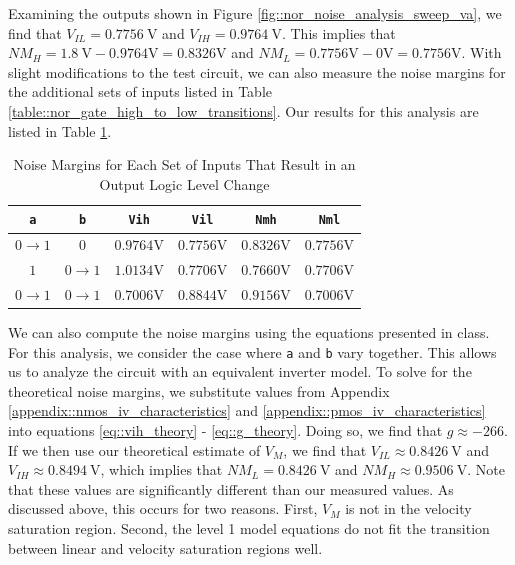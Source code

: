 \documentclass[fleqn]{article}
\begin{document}
	Examining the outputs shown in Figure \ref{fig::nor_noise_analysis_sweep_va}, we find that $V_{IL} = 0.7756\ \text{V}$ and $V_{IH} = 0.9764\ \text{V}$. This implies that $NM_{H} = 1.8\ \text{V} - 0.9764 \text{V} = 0.8326 \text{V}$ and $NM_{L} = 0.7756 \text{V} - 0 \text{V} = 0.7756 \text{V}$. With slight modifications to the test circuit, we can also measure the noise margins for the additional sets of inputs listed in Table \ref{table::nor_gate_high_to_low_transitions}. Our results for this analysis are listed in Table \ref{table::nor_gate_noise_analysis}.
	
	\begin{table}[H]
	\begin{center}
	\caption{Noise Margins for Each Set of Inputs That Result in an Output Logic Level Change}
	\label{table::nor_gate_noise_analysis}
	\begin{tabular}{| c | c | c | c | c | c |}
		\hline
		\texttt{a} & \texttt{b} & \texttt{Vih} & \texttt{Vil} & \texttt{Nmh} & \texttt{Nml} \\
		\hline	
		$0 \rightarrow 1$ & $0$ & $0.9764 \text{V}$ & $0.7756 \text{V}$ & $0.8326 \text{V}$ & $0.7756 \text{V}$\\
		\hline	
		$1$ & $0 \rightarrow 1$ & $1.0134 \text{V}$ & $0.7706 \text{V}$ & $0.7660 \text{V}$ & $0.7706 \text{V}$\\
		\hline	
		$0 \rightarrow 1$ & $0 \rightarrow 1$ & $0.7006 \text{V}$ & $0.8844 \text{V}$ & $0.9156 \text{V}$ & $0.7006 \text{V}$\\
		\hline
	\end{tabular}
	\end{center}
	\end{table}
	
	We can also compute the noise margins using the equations presented in class. For this analysis, we consider the case where \texttt{a} and \texttt{b} vary together. This allows us to analyze the circuit with an equivalent inverter model. To solve for the theoretical noise margins, we substitute values from Appendix \ref{appendix::nmos_iv_characteristics} and \ref{appendix::pmos_iv_characteristics} into equations \ref{eq::vih_theory} - \ref{eq::g_theory}. Doing so, we find that $g \approx -266$. If we then use our theoretical estimate of $V_{M}$, we find that $V_{IL} \approx 0.8426\ \text{V}$ and $V_{IH} \approx 0.8494\ \text{V}$, which implies that $NM_L = 0.8426\ \text{V}$ and $NM_H \approx 0.9506\ \text{V}$. Note that these values are significantly different than our measured values. As discussed above, this occurs for two reasons. First, $V_M$ is not in the velocity saturation region. Second, the level 1 model equations do not fit the transition between linear and velocity saturation regions well.
	
\end{document}
